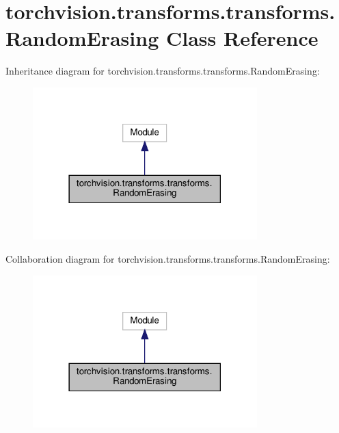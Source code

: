 \hypertarget{classtorchvision_1_1transforms_1_1transforms_1_1RandomErasing}{}\section{torchvision.\+transforms.\+transforms.\+Random\+Erasing Class Reference}
\label{classtorchvision_1_1transforms_1_1transforms_1_1RandomErasing}


Inheritance diagram for torchvision.\+transforms.\+transforms.\+Random\+Erasing\+:
\nopagebreak
\begin{figure}[H]
\begin{center}
\leavevmode
\includegraphics[width=246pt]{classtorchvision_1_1transforms_1_1transforms_1_1RandomErasing__inherit__graph}
\end{center}
\end{figure}


Collaboration diagram for torchvision.\+transforms.\+transforms.\+Random\+Erasing\+:
\nopagebreak
\begin{figure}[H]
\begin{center}
\leavevmode
\includegraphics[width=246pt]{classtorchvision_1_1transforms_1_1transforms_1_1RandomErasing__coll__graph}
\end{center}
\end{figure}
